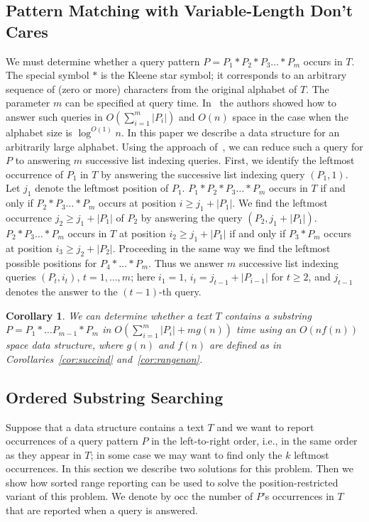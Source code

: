 \documentclass[11pt]{article}
\def\idrm#1{\ensuremath{\mathrm{#1}}}
\newcommand{\nono}[1]{}
\newtheorem{corollary}{Corollary}
\newcommand{\occ}{\idrm{occ}}
\begin{document}
\subsection{Pattern Matching with Variable-Length Don't Cares}
\label{sec:regpat}
We must determine whether a query pattern $P=P_1*P_2*P_3\ldots *P_m$ 
occurs in $T$. The special symbol $*$ is the Kleene star
 symbol; it corresponds to an arbitrary sequence of (zero or more) 
characters from the original alphabet of $T$.
The parameter $m$ can be specified at query time. 
In~\cite{YuWK10} the authors showed how to answer such queries in 
$O(\sum_{i=1}^m |P_i|)$ and $O(n)$ space in the case when the alphabet size 
is $\log^{O(1)}n$. In this paper we describe  a data structure 
for an arbitrarily large alphabet.
Using the approach of~\cite{YuWK10}, we can reduce such a query for  $P$ 
to answering $m$ successive list indexing queries.  
First, we identify the leftmost occurrence of $P_1$ in $T$ by answering 
the successive list indexing query $(P_1,1)$. 
Let $j_1$ denote the leftmost position of $P_1$.  
$P_1*P_2*P_3\ldots *P_m$ occurs in $T$ if and only if $P_2*P_3\ldots *P_m$ occurs at position $i\ge j_1+ |P_1|$. We find the leftmost occurrence
 $j_2\ge j_1+|P_1|$ of $P_2$ by answering the query $(P_2,j_1+|P_1|)$.  
$P_2*P_3\ldots *P_m$ occurs in $T$ at position $i_2\ge j_1+ |P_1|$ 
if and only if $P_3*P_m$ occurs at position $i_3\ge j_2+ |P_2|$. 
Proceeding in the same way we find the leftmost possible positions 
for $P_4*\ldots *P_m$. Thus we answer $m$ successive list indexing 
queries $(P_t,i_t)$, $t=1,\ldots, m$; here $i_1=1$, $i_t=j_{t-1}+|P_{i-1}|$ 
for $t\ge 2$, and $j_{t-1}$ denotes the answer to the $(t-1)$-th query.
\begin{corollary}\label{cor:dontcares}
We can determine whether a text $T$ contains a substring $P=P_1*\ldots P_{m-1}*P_m$   in $O(\sum_{i=1}^m|P_i|+mg(n))$ time using an $O(n f(n))$ space data structure, where $g(n)$ and $f(n)$ are defined as in Corollaries~\ref{cor:succind} and~\ref{cor:rangenon}.
\end{corollary}
\nono{Further applications of sorted range reporting and orthogonal range successor queries are discussed in the full version of this 
paper~\cite{NN12full}.}


\subsection{Ordered Substring Searching}
\label{sec:sortsubstr}
Suppose that a data structure contains a text $T$ and we want to report 
occurrences of a query pattern $P$ in the left-to-right order, i.e., in the 
same order as they appear in $T$; in some case we may want to find only 
the $k$ leftmost occurrences.
 In this section we describe two solutions for this problem. Then we show how sorted range reporting 
can be used to solve the position-restricted variant of this problem. We denote by $\occ$ the number of $P$'s occurrences in $T$ that are reported when a query is answered.
\end{document}

